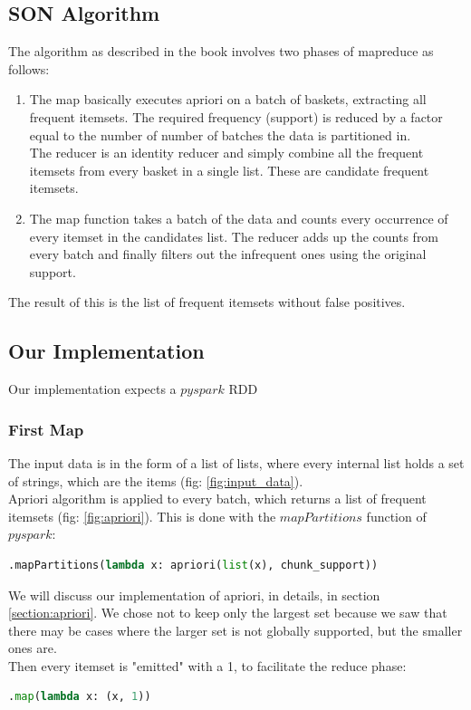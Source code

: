 \documentclass[a4paper]{article}
\begin{document}
	\subsection{SON Algorithm}	
	The algorithm as described in the book involves two phases of mapreduce as follows:
	\begin{enumerate}
	\item The map basically executes apriori on a batch of baskets, extracting all frequent itemsets. The required frequency (support) is reduced by a factor equal to the number of number of batches the data is partitioned in.\\
	The reducer is an identity reducer and simply combine all the frequent itemsets from every basket in a single list. These are candidate frequent itemsets.
	\item The map function takes a batch of the data and counts every occurrence of every itemset in the candidates list. The reducer adds up the counts from every batch and finally filters out the infrequent ones using the original support.
	\end{enumerate}
	The result of this is the list of frequent itemsets without false positives.
	
	\subsection{Our Implementation}
	Our implementation expects a $pyspark$ RDD\\
	
	\subsubsection{First Map}
	The input data is in the form of a list of lists, where every internal list holds a set of strings, which are the items (fig: \ref{fig:input_data}).\\
	
	Apriori algorithm is applied to every batch, which returns a list of frequent itemsets (fig: \ref{fig:apriori}). This is done with the $mapPartitions$ function of $pyspark$: 
	\begin{lstlisting}[language=Python]
.mapPartitions(lambda x: apriori(list(x), chunk_support))
	\end{lstlisting}	
	We will discuss our implementation of apriori, in details, in section \ref{section:apriori}. We chose not to keep only the largest set because we saw that there may be cases where the larger set is not globally supported, but the smaller ones are.\\
	Then every itemset is "emitted" with a 1, to facilitate the reduce phase:
	\begin{lstlisting}[language=Python]
.map(lambda x: (x, 1))
	\end{lstlisting}
	
\end{document}
